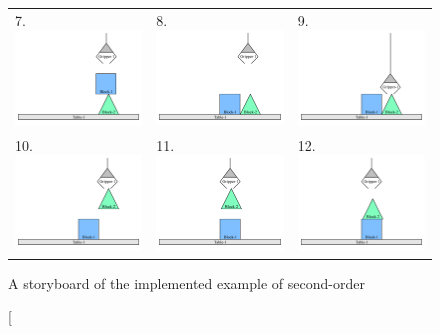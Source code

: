 \begin{figure}
\begin{center}
\begin{tabular}{p{4cm}p{4cm}p{4cm}}
7. \includegraphics[width=4cm]{gfx/blocks_world_example-7}  & 8. \includegraphics[width=4cm]{gfx/blocks_world_example-8}  & 9. \includegraphics[width=4cm]{gfx/blocks_world_example-9} \\
10. \includegraphics[width=4cm]{gfx/blocks_world_example-10} & 11. \includegraphics[width=4cm]{gfx/blocks_world_example-11} & 12. \includegraphics[width=4cm]{gfx/blocks_world_example-12}
\end{tabular}
\end{center}
\caption[A storyboard of the implemented example of second-order

\end{figure}
